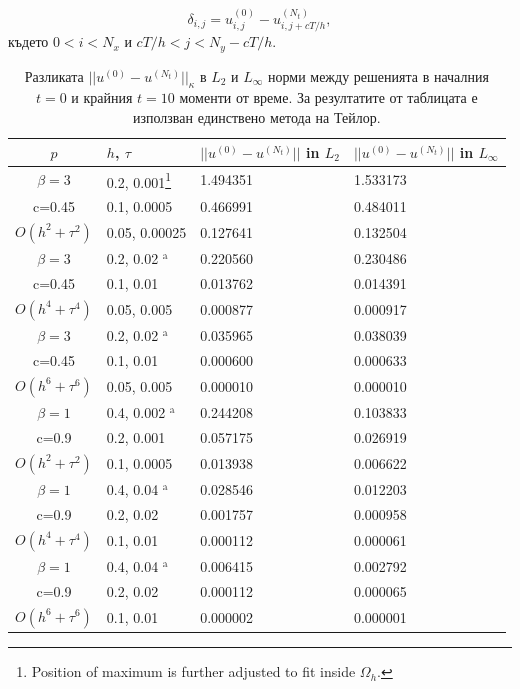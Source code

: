 \documentclass[a4paper]{article}
\newcommand{\be}{\begin{equation}}
\newcommand{\ee}{\end{equation}}
\theoremstyle{remark}
\begin{document}
\be\label{st_end_diff}
 \delta_{i,j} = u_{i,j}^{(0)} - u_{i,j+cT/h}^{(N_t)},
\ee
където $0 < i < N_x$ и $cT/h < j < N_y - cT/h$. 
\begin{table}[ht]
\centering
\small
		\begin{tabular}{||c|l|l|l||}
			\hline
			\hline
        $p$       & $h$, $\tau$  & $||u^{(0)} - u^{(N_t)}||$ in $L_2$  & $||u^{(0)} - u^{(N_t)}||$ in $L_\infty$   \\
   		\hline 
			\hline
  $\beta=3$                &0.2, 0.001\footnote{Position of maximum is further adjusted to fit inside $\Omega_h$.}            & 1.494351 & 1.533173    \\
   c=0.45                     &0.1, 0.0005          & 0.466991 & 0.484011       \\
     $O(h^2 + \tau^ 2)$ &0.05, 0.00025   & 0.127641 & 0.132504      \\
			\hline 
  $\beta=3$               &0.2, 0.02 $^{\text{a}}$      &0.220560 & 0.230486       \\
   c=0.45                    &0.1, 0.01      &0.013762 & 0.014391        \\
     $O(h^4+ \tau^4)$ &0.05, 0.005&0.000877 & 0.000917         \\
			\hline 
  $\beta=3$               &0.2, 0.02 $^{\text{a}}$       &  0.035965 & 0.038039        \\
     c=0.45                 &0.1, 0.01        &0.000600 & 0.000633       \\
     $O(h^6+ \tau^6)$ &0.05, 0.005 &0.000010 & 0.000010          \\
	   \hline
			\hline 
       $\beta=1$       &0.4, 0.002 $^{\text{a}}$       & 0.244208 & 0.103833 \\
                  c=0.9    &0.2, 0.001       &  0.057175 & 0.026919  \\
  $O(h^2+ \tau^2)$ &0.1, 0.0005   & 0.013938 & 0.006622  \\
			\hline
      $\beta=1$               &0.4, 0.04 $^{\text{a}}$    &0.028546 & 0.012203 \\
       c=0.9                     &0.2, 0.02     & 0.001757 & 0.000958     \\
       $O(h^4+ \tau^4)$ &0.1, 0.01   & 0.000112 & 0.000061   \\
    \hline
  $\beta=1$                  &0.4, 0.04 $^{\text{a}}$   &0.006415 & 0.002792  \\
      c=0.9                    &0.2, 0.02   &0.000112 & 0.000065     \\
     $O(h^6+ \tau^6)$ &0.1, 0.01 & 0.000002 & 0.000001         \\
	   \hline
			\hline 
		\end{tabular}
		\caption{Разликата $||u^{(0)} - u^{(N_t)}||_\kappa$ в $L_2$ и $L_\infty$ норми между решенията в началния $t=0$ и крайния $t=10$ моменти от време. За резултатите от таблицата е използван единствено метода на Тейлор.}
\label{tableG}
\end{table}
\end{document}
